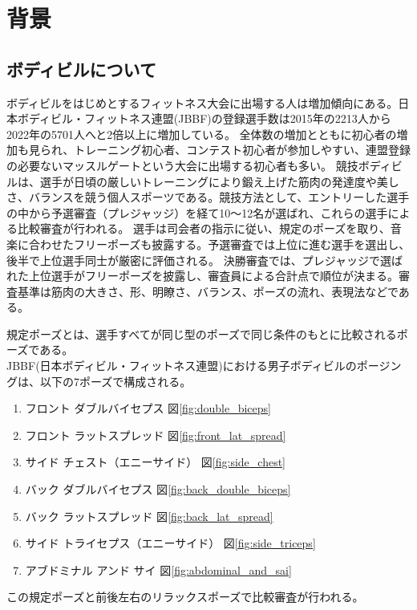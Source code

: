 \chapter{背景}
\label{background}
\section{ボディビルについて}
ボディビルをはじめとするフィットネス大会に出場する人は増加傾向にある。日本ボディビル・フィットネス連盟(JBBF)の登録選手数は2015年の2213人から2022年の5701人へと2倍以上に増加している\cite{jbbf}。
全体数の増加とともに初心者の増加も見られ、トレーニング初心者、コンテスト初心者が参加しやすい、連盟登録の必要ないマッスルゲートという大会に出場する初心者も多い。
競技ボディビルは、選手が日頃の厳しいトレーニングにより鍛え上げた筋肉の発達度や美しさ、バランスを競う個人スポーツである。競技方法として、エントリーした選手の中から予選審査（プレジャッジ）を経て10～12名が選ばれ、これらの選手による比較審査が行われる。
選手は司会者の指示に従い、規定のポーズを取り、音楽に合わせたフリーポーズも披露する。予選審査では上位に進む選手を選出し、後半で上位選手同士が厳密に評価される。
決勝審査では、プレジャッジで選ばれた上位選手がフリーポーズを披露し、審査員による合計点で順位が決まる。\cite{bodybuilding}審査基準は筋肉の大きさ、形、明瞭さ、バランス、ポーズの流れ、表現法などである。

規定ポーズとは、選手すべてが同じ型のポーズで同じ条件のもとに比較されるポーズである。\cite{posing_performance_jbbf} \\
JBBF(日本ボディビル・フィットネス連盟)における男子ボディビルのポージングは、以下の7ポーズで構成される。
\begin{enumerate}
    \item フロント ダブルバイセプス 図\ref{fig:double_biceps}
    \item フロント ラットスプレッド 図\ref{fig:front_lat_spread}
    \item サイド チェスト（エニーサイド） 図\ref{fig:side_chest}
    \item バック ダブルバイセプス 図\ref{fig:back_double_biceps}
    \item バック ラットスプレッド 図\ref{fig:back_lat_spread}
    \item サイド トライセプス（エニーサイド） 図\ref{fig:side_triceps}
    \item アブドミナル アンド サイ 図\ref{fig:abdominal_and_sai}
\end{enumerate}
この規定ポーズと前後左右のリラックスポーズで比較審査が行われる。

